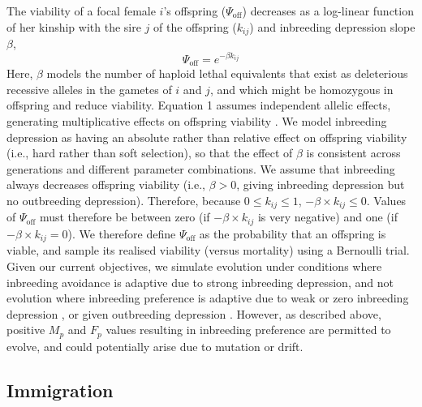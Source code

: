 \documentclass[12pt]{article}
\begin{document}
The viability of a focal female $i$'s offspring ($\Psi_{\textrm{off}}$) decreases as a log-linear function of her kinship with the sire $j$ of the offspring ($k_{ij}$) and inbreeding depression slope $\beta$,
\begin{equation}
\Psi_{\textrm{off}} = e^{-\beta k_{ij}}
\end{equation}
Here, $\beta$ models the number of haploid lethal equivalents that exist as deleterious recessive alleles in the gametes of $i$ and $j$, and which might be homozygous in offspring and reduce viability. Equation 1 assumes independent allelic effects, generating multiplicative effects on offspring viability \cite[][]{Morton1956, Mills1994}. We model inbreeding depression as having an absolute rather than relative effect on offspring viability (i.e., hard rather than soft selection), so that the effect of $\beta$ is consistent across generations and different parameter combinations. We assume that inbreeding always decreases offspring viability (i.e., $\beta > 0$, giving inbreeding depression but no outbreeding depression). Therefore, because $0 \leq k_{ij} \leq 1$, $-\beta \times k_{ij} \leq 0$. Values of $\Psi_{\textrm{off}}$ must therefore be between zero (if $-\beta \times k_{ij}$ is very negative) and one (if $-\beta \times k_{ij} = 0$). We therefore define $\Psi_{\textrm{off}}$ as the probability that an offspring is viable, and sample its realised viability (versus mortality) using a Bernoulli trial. Given our current objectives, we simulate evolution under conditions where inbreeding avoidance is adaptive due to strong inbreeding depression, and not evolution where inbreeding preference is adaptive due to weak or zero inbreeding depression \cite[][]{Parker1979, Kokko2006, Duthie2016a}, or given outbreeding depression \cite[][]{Bateson1983, Greeff2009}. However, as described above, positive $M_{p}$ and $F_{p}$ values resulting in inbreeding preference are permitted to evolve, and could potentially arise due to mutation or drift.

\subsection*{Immigration}
\end{document}
